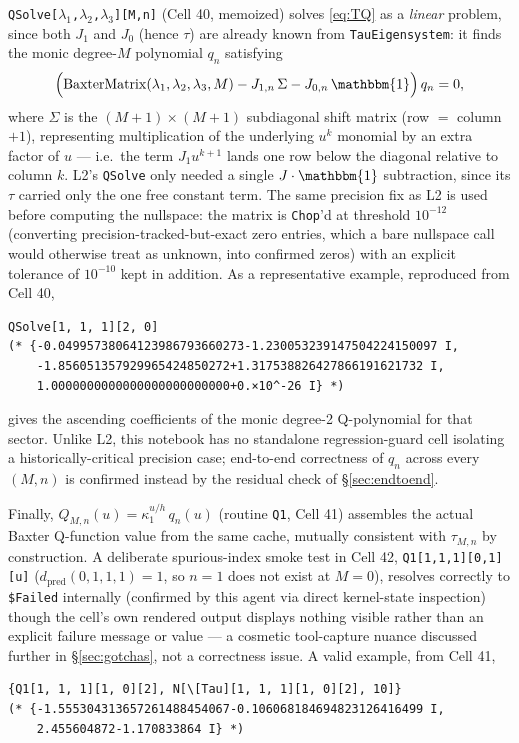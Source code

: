 \documentclass[11pt]{article}
\begin{document}
\texttt{QSolve[$\lambda_1$,$\lambda_2$,$\lambda_3$][M,n]} (Cell 40, memoized) solves \eqref{eq:TQ} as
a \emph{linear} problem, since both $J_1$ and $J_0$ (hence $\tau$) are already known from
\texttt{TauEigensystem}: it finds the monic degree-$M$ polynomial $q_n$ satisfying
\[
  \Bigl(\mathrm{BaxterMatrix}(\lambda_1,\lambda_2,\lambda_3,M) - J_{1,n}\,\Sigma - J_{0,n}\,\mathbbm{1}\Bigr)\, q_n = 0,
\]
where $\Sigma$ is the $(M{+}1)\times(M{+}1)$ subdiagonal shift matrix (row $=$ column $+1$),
representing multiplication of the underlying $u^k$ monomial by an extra factor of $u$ --- i.e.\ the
term $J_1u^{k+1}$ lands one row below the diagonal relative to column $k$. L2's \texttt{QSolve} only
needed a single $J\cdot\mathbbm{1}$ subtraction, since its $\tau$ carried only the one free constant
term. The same precision fix as L2 is used before computing the nullspace: the matrix is
\texttt{Chop}'d at threshold $10^{-12}$ (converting precision-tracked-but-exact zero entries, which a
bare nullspace call would otherwise treat as unknown, into confirmed zeros) with an explicit
tolerance of $10^{-10}$ kept in addition. As a representative example, reproduced from Cell 40,
\begin{verbatim}
QSolve[1, 1, 1][2, 0]
(* {-0.04995738064123986793660273-1.230053239147504224150097 I,
    -1.856051357929965424850272+1.317538826427866191621732 I,
    1.0000000000000000000000000+0.×10^-26 I} *)
\end{verbatim}
gives the ascending coefficients of the monic degree-2 Q-polynomial for that sector. Unlike L2, this
notebook has no standalone regression-guard cell isolating a historically-critical precision case;
end-to-end correctness of $q_n$ across every $(M,n)$ is confirmed instead by the residual check of
\S\ref{sec:endtoend}.

Finally, $Q_{M,n}(u)=\kappa_1^{u/h}\,q_n(u)$ (routine \texttt{Q1}, Cell 41) assembles the actual
Baxter Q-function value from the same cache, mutually consistent with $\tau_{M,n}$ by construction. A
deliberate spurious-index smoke test in Cell 42, \texttt{Q1[1,1,1][0,1][u]}
($d_{\mathrm{pred}}(0,1,1,1)=1$, so $n=1$ does not exist at $M=0$), resolves correctly to
\texttt{\$Failed} internally (confirmed by this agent via direct kernel-state inspection) though the
cell's own rendered output displays nothing visible rather than an explicit failure message or value
--- a cosmetic tool-capture nuance discussed further in \S\ref{sec:gotchas}, not a correctness issue.
A valid example, from Cell 41,
\begin{verbatim}
{Q1[1, 1, 1][1, 0][2], N[\[Tau][1, 1, 1][1, 0][2], 10]}
(* {-1.555304313657261488454067-0.106068184694823126416499 I,
    2.455604872-1.170833864 I} *)
\end{verbatim}
\end{document}
